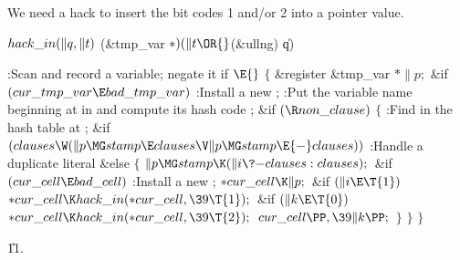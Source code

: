We need a hack to insert the bit codes 1 and/or 2 into a
pointer value.

\Y\B\4\D$\\{hack\_in}(\|q,\|t)$ \5
(\&{tmp\_var} ${}{*})(\|t\OR{}$(\&{ullng}) \|q)\par
\Y\B\4:Scan and record a variable; negate it if \X${}\E{}$%
\6
${}\{{}$\1\6
\&{register} \&{tmp\_var} ${}{*}\|p;{}$\7
\&{if} ${}(\\{cur\_tmp\_var}\E\\{bad\_tmp\_var}){}$\1\5
:Install a new \X;\2\6
:Put the variable name beginning at  in  and compute its hash code \X;\6
\&{if} ${}(\R\\{non\_clause}){}$\5
${}\{{}$\1\6
:Find  in the hash table at \X;\6
\&{if} ${}(\\{clauses}\W(\|p\MG\\{stamp}\E\\{clauses}\V\|p\MG\\{stamp}\E{-}%
\\{clauses})){}$\1\5
:Handle a duplicate literal\X\2\6
\&{else}\5
${}\{{}$\1\6
${}\|p\MG\\{stamp}\K(\|i\?{-}\\{clauses}:\\{clauses});{}$\6
\&{if} ${}(\\{cur\_cell}\E\\{bad\_cell}){}$\1\5
:Install a new \X;\2\6
${}{*}\\{cur\_cell}\K\|p;{}$\6
\&{if} ${}(\|i\E\T{1}){}$\1\5
${}{*}\\{cur\_cell}\K\\{hack\_in}({*}\\{cur\_cell},\39\T{1});{}$\2\6
\&{if} ${}(\|k\E\T{0}){}$\1\5
${}{*}\\{cur\_cell}\K\\{hack\_in}({*}\\{cur\_cell},\39\T{2});{}$\2\6
${}\\{cur\_cell}\PP,\39\|k\PP;{}$\6
\4${}\}{}$\2\6
\4${}\}{}$\2\6
\4${}\}{}$\2\par
\U11.\fi

